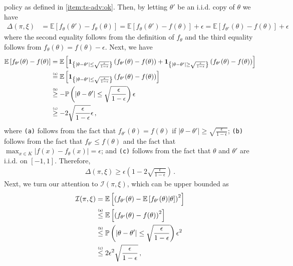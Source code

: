 \documentclass[letter, 12pt]{report}
\newcommand{\explan}[1]{\stackrel{\text{\tiny \texttt{#1}}}}
\newcommand{\paren}[1]{\left( #1 \right)}
\newcommand{\brak}[1]{\left[ #1 \right]}
\newcommand{\E}{\mathbb E}
\newcommand{\sind}{\bm{1}}
\newcommand{\I}{\mathcal{I}}
\newcommand{\1}{\mathbf{1}}
\theoremstyle{plain}
\theoremstyle{definition}
\theoremstyle{remark}
\begin{document}
policy as defined in \ref{item:ts-adv:ok}.
Then, by letting $\theta'$ be an i.i.d. copy of $\theta$ we have
\begin{align*}
    \Delta(\pi, \xi)
     & =
    \E\brak{
        f_{\theta}(\theta') - f_\theta(\theta)
    }
    =
    \E\brak{
        f_{\theta}(\theta') - f(\theta)
    } + \epsilon
    =
    \E\brak{
        f_{\theta'}(\theta) - f(\theta)
    } + \epsilon
\end{align*}
where the second equality follows from the definition of $f_\theta$ and the third equality follows from $f_\theta(\theta) = f(\theta) - \epsilon$.
Next, we have
\begin{align*}
    \E\brak{
        f_{\theta'}(\theta) - f(\theta)
    }
     & =
    \E\brak{
        \sind_{
            \left\{
            |\theta - \theta'| \leq \sqrt{\frac{\epsilon}{1-\epsilon}}
            \right\}
        }
        \paren{
            f_{\theta'}(\theta) - f(\theta)
        }
        +
        \sind_{
            \left\{
            |\theta - \theta'| \geq \sqrt{\frac{\epsilon}{1-\epsilon}}
            \right\}
        }
        \paren{
            f_{\theta'}(\theta) - f(\theta)
        }
    }    \\
     &
    \explan{(a)}
    =
    \E\brak{
        \sind_{
            \left\{
            |\theta - \theta'| \leq \sqrt{\frac{\epsilon}{1-\epsilon}}
            \right\}
        }
        \paren{
            f_{\theta'}(\theta) - f(\theta)
        }
    }
    \\
     &
    \explan{(b)}
    \geq
    -
    \mathbb{P}\paren{
        |\theta - \theta'| \leq \sqrt{\frac{\epsilon}{1-\epsilon}}
    }
    \epsilon
    \\
     &
    \explan{(c)}
    \geq
    -
    2 \sqrt{\frac{\epsilon}{1-\epsilon}}
    \epsilon\,,
\end{align*}
where \texttt{(a)} follows from the fact that $f_{\theta'}(\theta) = f(\theta)$
if $|\theta - \theta'| \geq \sqrt{\frac{\epsilon}{1-\epsilon}}$;
\texttt{(b)} follows from the fact that $f_{\theta'} \leq f(\theta)$
and the fact that $\max_{x \in K} |f(x) - f_\theta(x)| = \epsilon$;
and \texttt{(c)} follows from the fact that $\theta$ and $\theta'$ are i.i.d. on $[-1,1]$.
Therefore,
\begin{align*}
    \Delta(\pi, \xi)
    \geq
    \epsilon \paren{1 - 2 \sqrt{\frac{\epsilon}{1-\epsilon}}}\,.
\end{align*}
Next, we turn our attention to $\I(\pi, \xi)$, which can be upper bounded as
\begin{align*}
    \I(\pi, \xi)
     & =
    \E\brak{
        \paren{
            f_{\theta'}(\theta) - \E\brak{f_{\theta'}(\theta)|\theta}
        }^2
    }
    \\
     &
    \explan{(a)}
    \leq
    \E\brak{
        \paren{
            f_{\theta'}(\theta) - f(\theta)
        }^2
    }
    \\
     &
    \explan{(b)}
    \leq
    \mathbb{P}\paren{
        |\theta - \theta'| \leq \sqrt{\frac{\epsilon}{1-\epsilon}}
    }
    \epsilon^2
    \\
     &
    \explan{(c)}
    \leq
    2 \epsilon^2\sqrt{\frac{\epsilon}{1-\epsilon}}\,,
\end{align*}
\end{document}
